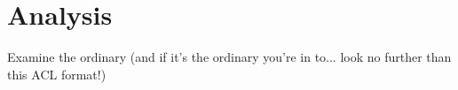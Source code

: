 \section{Analysis}

Examine the ordinary (and if it's the ordinary you're in to... look no further than this ACL format!)
